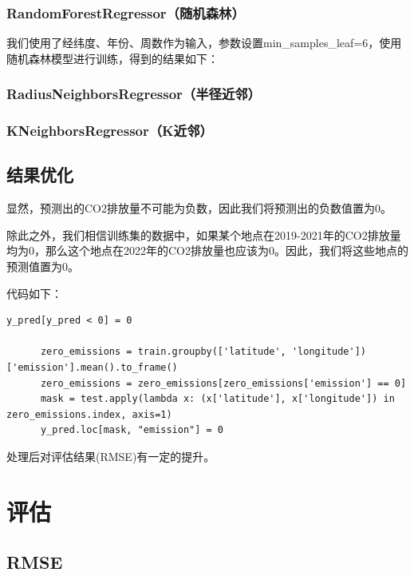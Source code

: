 \documentclass{ctexart}
\begin{document}
\subsubsection{RandomForestRegressor（随机森林）}

我们使用了经纬度、年份、周数作为输入，参数设置min\_samples\_leaf=6，使用随机森林模型进行训练，得到的结果如下：

\subsubsection{RadiusNeighborsRegressor（半径近邻）}

\subsubsection{KNeighborsRegressor（K近邻）}


\subsection{结果优化}

显然，预测出的CO2排放量不可能为负数，因此我们将预测出的负数值置为0。

除此之外，我们相信训练集的数据中，如果某个地点在2019-2021年的CO2排放量均为0，那么这个地点在2022年的CO2排放量也应该为0。因此，我们将这些地点的预测值置为0。

代码如下：

\begin{lstlisting}[style=Python]
      y_pred[y_pred < 0] = 0
      
      zero_emissions = train.groupby(['latitude', 'longitude'])['emission'].mean().to_frame()
      zero_emissions = zero_emissions[zero_emissions['emission'] == 0]
      mask = test.apply(lambda x: (x['latitude'], x['longitude']) in zero_emissions.index, axis=1)
      y_pred.loc[mask, "emission"] = 0
\end{lstlisting}

处理后对评估结果(RMSE)有一定的提升。

\section{评估}

\subsection{RMSE}
\end{document}
